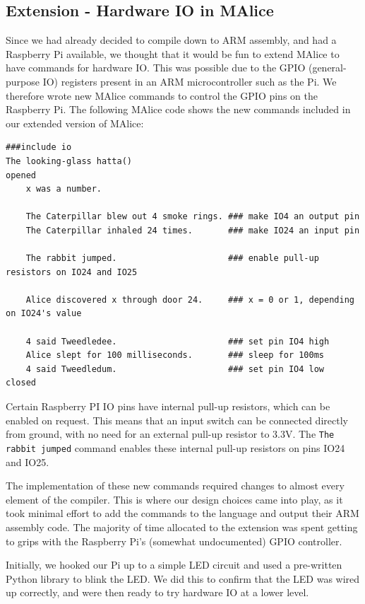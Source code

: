 \documentclass[11pt, notitlepage]{report}
\begin{document}
\subsection*{Extension - Hardware IO in MAlice}
Since we had already decided to compile down to ARM assembly, and had a Raspberry Pi available, we thought that it would be fun to extend MAlice to have commands for hardware IO. This was possible due to the GPIO (general-purpose IO) registers present in an ARM microcontroller such as the Pi. We therefore wrote new MAlice commands to control the GPIO pins on the Raspberry Pi. The following MAlice code shows the new commands included in our extended version of MAlice:

\begin{verbatim}
###include io
The looking-glass hatta()
opened
    x was a number.

    The Caterpillar blew out 4 smoke rings. ### make IO4 an output pin
    The Caterpillar inhaled 24 times.       ### make IO24 an input pin

    The rabbit jumped.                      ### enable pull-up resistors on IO24 and IO25

    Alice discovered x through door 24.     ### x = 0 or 1, depending on IO24's value

    4 said Tweedledee.                      ### set pin IO4 high
    Alice slept for 100 milliseconds.       ### sleep for 100ms
    4 said Tweedledum.                      ### set pin IO4 low
closed
\end{verbatim}

Certain Raspberry PI IO pins have internal pull-up resistors, which can be enabled on request. This means that an input switch can be connected directly from ground, with no need for an external pull-up resistor to 3.3V. The \texttt{The rabbit jumped} command enables these internal pull-up resistors on pins IO24 and IO25.

The implementation of these new commands required changes to almost every element of the compiler. This is where our design choices came into play, as it took minimal effort to add the commands to the language and output their ARM assembly code. The majority of time allocated to the extension was spent getting to grips with the Raspberry Pi's (somewhat undocumented) GPIO controller.

Initially, we hooked our Pi up to a simple LED circuit and used a pre-written Python library to blink the LED. We did this to confirm that the LED was wired up correctly, and were then ready to try hardware IO at a lower level.$  $
\end{document}
